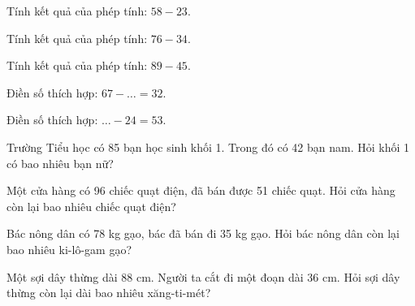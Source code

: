 \begin{ex}
Tính kết quả của phép tính: $58 - 23$.
\end{ex}

\begin{ex}
Tính kết quả của phép tính: $76 - 34$.
\end{ex}

\begin{ex}
Tính kết quả của phép tính: $89 - 45$.
\end{ex}

\begin{ex}
Điền số thích hợp: $67 - \dots = 32$.
\end{ex}

\begin{ex}
Điền số thích hợp: $\dots - 24 = 53$.
\end{ex}

\begin{ex}
Trường Tiểu học có 85 bạn học sinh khối 1. Trong đó có 42 bạn nam. Hỏi khối 1 có bao nhiêu bạn nữ?
\end{ex}

\begin{ex}
Một cửa hàng có 96 chiếc quạt điện, đã bán được 51 chiếc quạt. Hỏi cửa hàng còn lại bao nhiêu chiếc quạt điện?
\end{ex}

\begin{ex}
Bác nông dân có 78 kg gạo, bác đã bán đi 35 kg gạo. Hỏi bác nông dân còn lại bao nhiêu ki-lô-gam gạo?
\end{ex}

\begin{ex}
Một sợi dây thừng dài 88 cm. Người ta cắt đi một đoạn dài 36 cm. Hỏi sợi dây thừng còn lại dài bao nhiêu xăng-ti-mét?
\end{ex}

